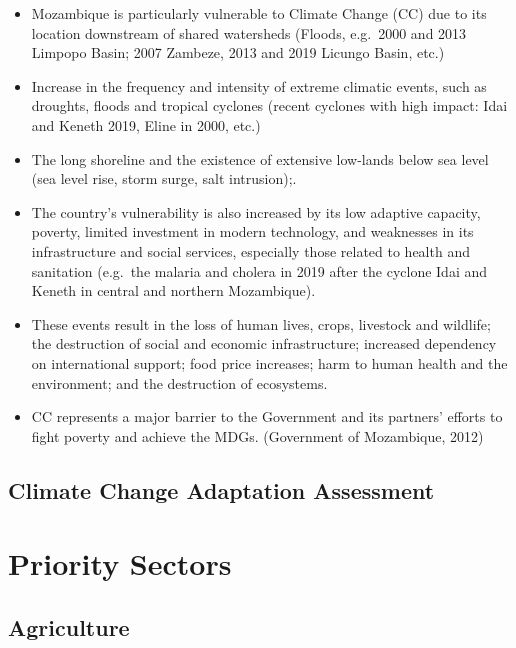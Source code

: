 \documentclass[
]{book}
\begin{document}
\begin{itemize}
\item
  Mozambique is particularly vulnerable to Climate Change (CC) due to its location downstream of shared watersheds (Floods, e.g.~2000 and 2013 Limpopo Basin; 2007 Zambeze, 2013 and 2019 Licungo Basin, etc.)
\item
  Increase in the frequency and intensity of extreme climatic events, such as droughts, floods and tropical cyclones (recent cyclones with high impact: Idai and Keneth 2019, Eline in 2000, etc.)
\item
  The long shoreline and the existence of extensive low-lands below sea level (sea level rise, storm surge, salt intrusion);.
\item
  The country's vulnerability is also increased by its low adaptive capacity, poverty, limited investment in modern technology, and weaknesses in its infrastructure and social services, especially those related to health and sanitation (e.g.~the malaria and cholera in 2019 after the cyclone Idai and Keneth in central and northern Mozambique).
\item
  These events result in the loss of human lives, crops, livestock and wildlife; the destruction of social and economic infrastructure; increased dependency on international support; food price increases; harm to human health and the environment; and the destruction of ecosystems.
\item
  CC represents a major barrier to the Government and its partners' efforts to fight poverty and achieve the MDGs.
  (Government of Mozambique, 2012)
\end{itemize}

\hypertarget{climate-change-adaptation-assessment}{%
\section{Climate Change Adaptation Assessment}\label{climate-change-adaptation-assessment}}

\hypertarget{priority-sectors}{%
\chapter{Priority Sectors}\label{priority-sectors}}

\hypertarget{agriculture}{%
\section{Agriculture}\label{agriculture}}
\end{document}
